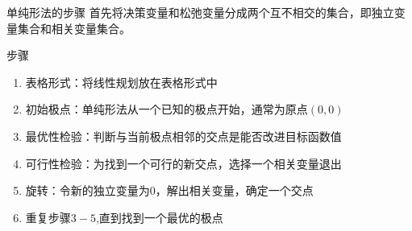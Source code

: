 \documentclass[mathserif, table]{beamer}
\begin{document}
\begin{frame}{单纯形法的步骤}
  首先将决策变量和松弛变量分成两个互不相交的集合，即独立变量集合和相关变量集合。

  \begin{block}{步骤}
    \begin{enumerate}
    \item 表格形式：将线性规划放在表格形式中
    \item 初始极点：单纯形法从一个已知的极点开始，通常为原点$(0,0)$
    \item 最优性检验：判断与当前极点相邻的交点是能否改进目标函数值
    \item 可行性检验：为找到一个可行的新交点，选择一个相关变量退出
    \item 旋转：令新的独立变量为0，解出相关变量，确定一个交点
    \item 重复步骤$3 - 5$,直到找到一个最优的极点
    \end{enumerate}
  \end{block}

\end{frame}
\end{document}
